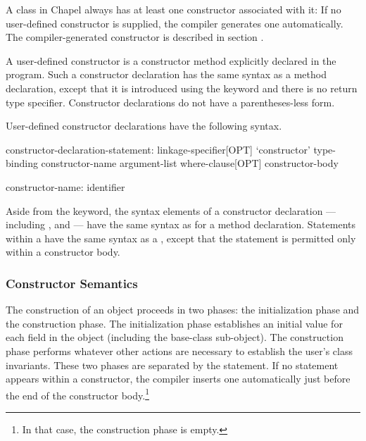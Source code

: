 A class in Chapel always has at least one constructor associated with it: If no
user-defined constructor is supplied, the compiler generates one automatically.
The compiler-generated constructor is described in section .

A user-defined constructor is a constructor method explicitly declared
in the program.  Such a constructor declaration has the same
syntax as a method declaration, except that it is introduced using
the  keyword and there is no return type specifier.
Constructor declarations do not have a parentheses-less form.

User-defined constructor declarations have the following syntax.
\begin{syntax}
constructor-declaration-statement:
  linkage-specifier[OPT] `constructor' type-binding constructor-name argument-list 
    where-clause[OPT] constructor-body

constructor-name:
  identifier
\end{syntax}

Aside from the  keyword, the syntax elements of a constructor
declaration --- including , 
and  ---  have the same syntax as for a method declaration.
Statements within a  have the same syntax as
a , except that the  statement is permitted only
within a constructor body.

\subsubsection{Constructor Semantics}

The construction of an object proceeds in two phases: the initialization phase
and the construction phase.  The initialization phase establishes an initial
value for each field in the object (including the base-class sub-object).  The
construction phase performs whatever other actions are necessary to establish
the user's class invariants.  These two phases are separated by the 
statement.  If no  statement appears within a constructor, the
compiler inserts one automatically just before the end of the constructor
body.\footnote{In that case, the construction phase is empty.}

